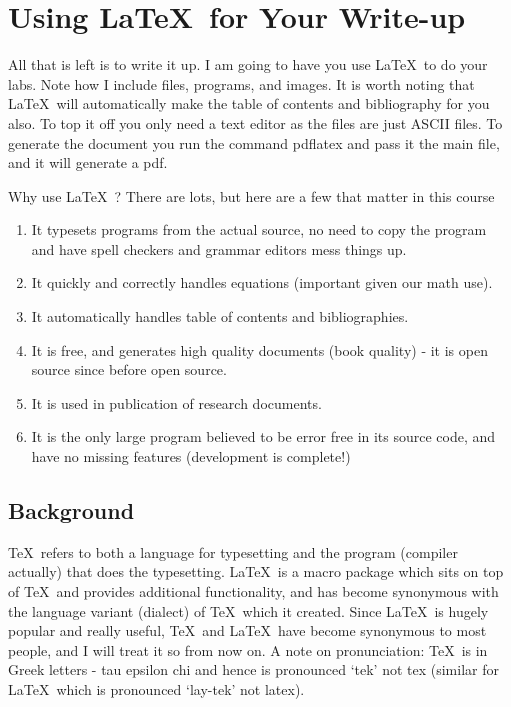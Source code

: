\section{Using \LaTeX\ for Your Write-up}

All that is left is to write it up.  I am going to have you use \LaTeX\ to do your labs. Note how I include files, programs, and images.  It is worth noting that \LaTeX\ will automatically make the table of contents and bibliography for you also.  To top it off you only need a text editor as the files are just ASCII files.  To generate the document you run the command pdflatex and pass it the main file, and it will generate a pdf.

Why use \LaTeX\ ?  There are lots, but here are a few that matter in this course
\begin{enumerate}
\item It typesets programs from the actual source, no need to copy the program and have spell checkers and grammar editors mess things up.
\item It quickly and correctly handles equations (important given our math use).
\item It automatically handles table of contents and bibliographies.
\item It is free, and generates high quality documents (book quality) - it is open source since before open source.
\item It is used in publication of research documents.
\item It is the only large program believed to be error free in its source code, and have no missing features (development is complete!)
\end{enumerate}


\subsection{Background}

\TeX\ refers to both a language for typesetting and the program (compiler actually) that does the typesetting.  \LaTeX\ is a macro package which sits on top of \TeX\ and provides additional functionality, and has become synonymous with the language variant (dialect) of \TeX\ which it created.  Since \LaTeX\ is hugely popular and really useful, \TeX\ and \LaTeX\ have become synonymous to most people, and I will treat it so from now on.  A note on pronunciation: \TeX\ is in Greek letters - tau epsilon chi and hence is pronounced `tek' not tex (similar for \LaTeX\, which is pronounced `lay-tek' not latex).

